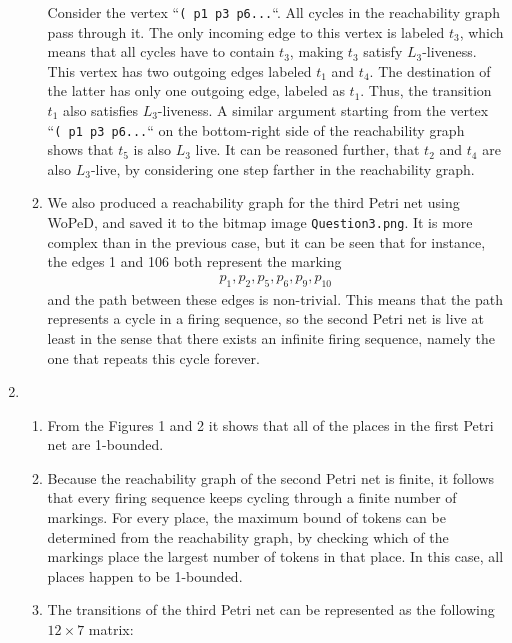 \documentclass[a4paper,notitlepage]{article}
\begin{document}
\begin{enumerate}[1.]
\begin{enumerate}[1)]
    			Consider the vertex ``\texttt{( p1 p3 p6...}``. All cycles in the
    			reachability graph pass through it. The only incoming edge to this
    			vertex is labeled $t_3$, which means that all cycles have to contain
    			$t_3$, making $t_3$ satisfy $L_3$-liveness. This vertex has two outgoing
    			edges labeled $t_1$ and $t_4$. The destination of the latter has only one
    			outgoing edge, labeled as $t_1$. Thus, the transition $t_1$ also satisfies
    			$L_3$-liveness. A similar argument starting from the vertex
    			``\texttt{( p1 p3 p6...}`` on the bottom-right side of the reachability
    			graph shows that $t_5$ is also $L_3$ live. It can be reasoned further,
    			that $t_2$ and $t_4$ are also $L_3$-live, by considering one step farther
    			in the reachability graph.
    		\item
    			We also produced a reachability graph for the third Petri net using
    			WoPeD, and saved it to the bitmap image \texttt{Question3.png}. It is
    			more complex than in the previous case, but it can be seen that for
    			instance, the edges 1 and 106 both represent the marking
    			\begin{align*}
    				p_1, p_2, p_5, p_6, p_9, p_{10}
				\end{align*}    			 
				and the path between these edges is non-trivial. This means that the
				path represents a cycle in a firing sequence, so the second Petri net is
				live at least in the sense that there exists an infinite firing sequence,
				namely the one that repeats this cycle forever.
    		\end{enumerate}
    	\item
    		\begin{enumerate}[1)]
    			\item
    				From the Figures 1 and 2 it shows that all of the places in the first
    				Petri net are 1-bounded.
				\item    				
    				Because the reachability graph of the second Petri net is finite, it
    				follows that every firing sequence keeps cycling through a finite
    				number of markings. For every place, the maximum bound of tokens can
    				be determined from the reachability graph, by checking which of the
    				markings place the largest number of tokens in that place. In this
    				case, all places happen to be 1-bounded.
    			\item
    				The transitions of the third Petri net can be represented as the
    				following $12 \times 7$ matrix:
    				\begin{equation*}

\end{equation*}
\end{enumerate}
\end{enumerate}
\end{document}
